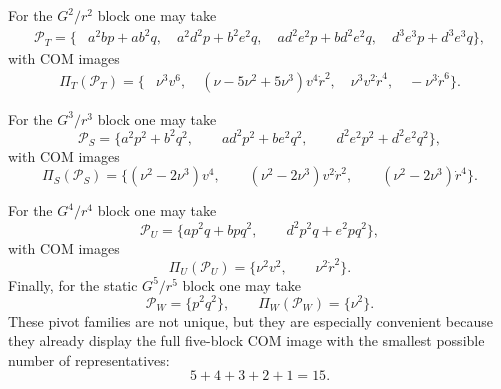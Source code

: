 \documentclass[11pt]{article}
\begin{document}
For the \(G^2/r^2\) block one may take
\begin{equation}
\begin{aligned}
\mathcal P_T=
\bigl\{
& a^2bp+ab^2q,
\quad
a^2d^2p+b^2e^2q,
\quad
ad^2e^2p+bd^2e^2q,
\quad
d^3e^3p+d^3e^3q
\bigr\},
\end{aligned}
\label{eq:app-4pn-local-scaffold-pivots-T}
\end{equation}
with COM images
\begin{equation}
\begin{aligned}
\Pi_T(\mathcal P_T)=
\bigl\{
& \nu^3 v^6,
\quad
(\nu-5\nu^2+5\nu^3)v^4\dot r^2,
\quad
\nu^3 v^2\dot r^4,
\quad
-\nu^3\dot r^6
\bigr\}.
\end{aligned}
\label{eq:app-4pn-local-scaffold-pivot-images-T}
\end{equation}

For the \(G^3/r^3\) block one may take
\begin{equation}
\mathcal P_S=
\bigl\{
 a^2p^2+b^2q^2,
 \qquad
 ad^2p^2+be^2q^2,
 \qquad
 d^2e^2p^2+d^2e^2q^2
\bigr\},
\label{eq:app-4pn-local-scaffold-pivots-S}
\end{equation}
with COM images
\begin{equation}
\Pi_S(\mathcal P_S)=
\bigl\{
(\nu^2-2\nu^3)v^4,
\qquad
(\nu^2-2\nu^3)v^2\dot r^2,
\qquad
(\nu^2-2\nu^3)\dot r^4
\bigr\}.
\label{eq:app-4pn-local-scaffold-pivot-images-S}
\end{equation}

For the \(G^4/r^4\) block one may take
\begin{equation}
\mathcal P_U=
\bigl\{
 ap^2q+bpq^2,
 \qquad
 d^2p^2q+e^2pq^2
\bigr\},
\label{eq:app-4pn-local-scaffold-pivots-U}
\end{equation}
with COM images
\begin{equation}
\Pi_U(\mathcal P_U)=
\bigl\{
\nu^2 v^2,
\qquad
\nu^2\dot r^2
\bigr\}.
\label{eq:app-4pn-local-scaffold-pivot-images-U}
\end{equation}
Finally, for the static \(G^5/r^5\) block one may take
\begin{equation}
\mathcal P_W=\{p^2q^2\},
\qquad
\Pi_W(\mathcal P_W)=\{\nu^2\}.
\label{eq:app-4pn-local-scaffold-pivots-W}
\end{equation}
These pivot families are not unique, but they are especially convenient because
they already display the full five-block COM image with the smallest possible
number of representatives:
\begin{equation}
5+4+3+2+1=15.
\label{eq:app-4pn-local-scaffold-pivot-total}
\end{equation}
\end{document}
